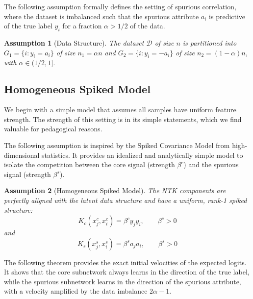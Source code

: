 \documentclass[letter,11pt]{article}
\newtheorem{assumption}{Assumption}
\begin{document}
The following assumption formally defines the setting of spurious correlation, where the dataset is imbalanced such that the spurious attribute $a_i$ is predictive of the true label $y_i$ for a fraction $\alpha>1/2$ of the data.
\begin{assumption}[Data Structure]\label{assum:data_structure}
    The dataset $\mathcal{D}$ of size $n$ is partitioned into $G_1 = \{i : y_i = a_i\}$ of size $n_1 = \alpha n$ and $G_2 = \{i : y_i = -a_i\}$ of size $n_2 = (1-\alpha) n$, with $\alpha \in (1/2, 1]$.
\end{assumption}

\subsection{Homogeneous Spiked Model}\label{sec:homo-spiked}

We begin with a simple model that assumes all samples have uniform feature strength. The strength of this setting is in its simple statements, which we find valuable for pedagogical reasons.

The following assumption is inspired by the Spiked Covariance Model from high-dimensional statistics. It provides an idealized and analytically simple model to isolate the competition between the core signal (strength $\beta^c$) and the spurious signal (strength $\beta^s$).
\begin{assumption}[Homogeneous Spiked Model]\label{assum:homo_spike}
    The NTK components are perfectly aligned with the latent data structure and have a uniform, rank-1 spiked structure:
    \begin{equation}
        K_c(x_j^c, x_i^c) = \beta^c y_j y_i, \qquad \beta^c > 0
    \end{equation}
and 
\begin{equation}
    K_s(x_j^s, x_i^s) = \beta^s a_j a_i, \qquad \beta^s > 0
\end{equation}
\end{assumption}

The following theorem provides the exact initial velocities of the expected logits. It shows that the core subnetwork always learns in the direction of the true label, while the spurious subnetwork learns in the direction of the spurious attribute, with a velocity amplified by the data imbalance $2\alpha-1$.
\end{document}
